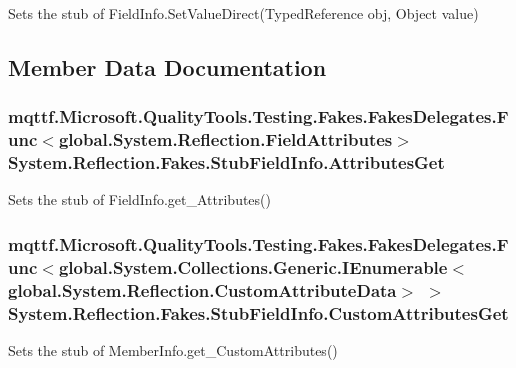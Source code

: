 Sets the stub of Field\-Info.\-Set\-Value\-Direct(\-Typed\-Reference obj, Object value)



\subsection{Member Data Documentation}
\hypertarget{class_system_1_1_reflection_1_1_fakes_1_1_stub_field_info_a3e9c78d9a96102aaec573b34d4c1a95b}{
\subsubsection[{Attributes\-Get}]{\setlength{\rightskip}{0pt plus 5cm}mqttf.\-Microsoft.\-Quality\-Tools.\-Testing.\-Fakes.\-Fakes\-Delegates.\-Func$<$global.\-System.\-Reflection.\-Field\-Attributes$>$ System.\-Reflection.\-Fakes.\-Stub\-Field\-Info.\-Attributes\-Get}}\label{class_system_1_1_reflection_1_1_fakes_1_1_stub_field_info_a3e9c78d9a96102aaec573b34d4c1a95b}


Sets the stub of Field\-Info.\-get\-\_\-\-Attributes()

\hypertarget{class_system_1_1_reflection_1_1_fakes_1_1_stub_field_info_abec9b027185a5fd80b2cf3fa99432216}{
\subsubsection[{Custom\-Attributes\-Get}]{\setlength{\rightskip}{0pt plus 5cm}mqttf.\-Microsoft.\-Quality\-Tools.\-Testing.\-Fakes.\-Fakes\-Delegates.\-Func$<$global.\-System.\-Collections.\-Generic.\-I\-Enumerable$<$global.\-System.\-Reflection.\-Custom\-Attribute\-Data$>$ $>$ System.\-Reflection.\-Fakes.\-Stub\-Field\-Info.\-Custom\-Attributes\-Get}}\label{class_system_1_1_reflection_1_1_fakes_1_1_stub_field_info_abec9b027185a5fd80b2cf3fa99432216}


Sets the stub of Member\-Info.\-get\-\_\-\-Custom\-Attributes()

